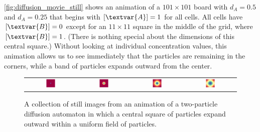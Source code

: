 \autoref{fig:diffusion_movie_still} shows an animation of a $101 \times 101$ board with $d_A = 0.5$ and $d_A = 0.25$ that begins with $[\textvar{A}] = 1$ for all cells. All cells have $[\textvar{B}] = 0$ except for an $11 \times 11$ square in the middle of the grid, where $[\textvar{B}] = 1$. (There is nothing special about the dimensions of this central square.) Without looking at individual concentration values, this animation allows us to see immediately that the  particles are remaining in the corners, while a band of  particles expands outward from the center.\\

\begin{note}\end{note}

\begin{figure}[h]
\centering
\mySfFamily
\begin{tabular}{c c c c}
\includegraphics[width = 0.19\textwidth]{../images/diffusion__Moment_1} & \includegraphics[width = 0.19\textwidth]{../images/diffusion__Moment_2} &
\includegraphics[width = 0.19\textwidth]{../images/diffusion__Moment_3} & \includegraphics[width = 0.19\textwidth]{../images/diffusion__Moment_4}
\end{tabular}
\caption{A collection of still images from an animation of a two-particle diffusion automaton in which a central square of  particles expand outward within a uniform field of  particles.}
\label{fig:diffusion_movie_still}
\end{figure}

